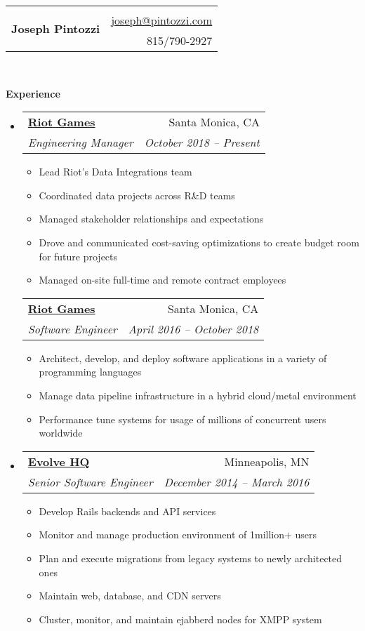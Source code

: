 \documentclass[letterpaper,12pt]{article}
\makeatletter
\newcommand{\resitem}[1]{\item #1 \vspace{-2pt}}
\newcommand{\resheading}[1]{{\large \colorbox{mygrey}{\begin{minipage}{\textwidth}{\textbf{#1 \vphantom{p\^{E}}}}\end{minipage}}}}
\newcommand{\ressubheading}[4]{
      \begin{tabular*}{6.5in}{l@{\extracolsep{\fill}}r}
        \textbf{#1} & #2 \\
        \textit{#3} & \textit{#4} \\
      \end{tabular*}\vspace{-6pt}}
\makeatother
\begin{document}
\newcommand{\mywebheader}{
  \begin{tabular*}{7in}{l@{\extracolsep{\fill}}r}
    \multirow{4}{*}{\huge \bf Joseph Pintozzi} \\
                            & \href{mailto:joseph@pintozzi.com}{joseph@pintozzi.com}\\
                            & {815/790-2927}
  \end{tabular*}
\\
\vspace{0.1in}
}

\mywebheader

\resheading{Experience}
\begin{itemize}
  \item
    \ressubheading{\href{http://riotgames.com}{Riot Games}}{Santa Monica, CA}{Engineering Manager}{October 2018 -- Present}
    { \footnotesize
    \begin{itemize}
        \resitem{Lead Riot's Data Integrations team}
        \resitem{Coordinated data projects across R\&D teams}
        \resitem{Managed stakeholder relationships and expectations}
        \resitem{Drove and communicated cost-saving optimizations to create budget room for future projects}
        \resitem{Managed on-site full-time and remote contract employees}
    \end{itemize}
    }
    \ressubheading{\href{http://riotgames.com}{Riot Games}}{Santa Monica, CA}{Software Engineer}{April 2016 -- October 2018}
    { \footnotesize
    \begin{itemize}
        \resitem{Architect, develop, and deploy software applications in a variety of programming languages}
        \resitem{Manage data pipeline infrastructure in a hybrid cloud/metal environment}
        \resitem{Performance tune systems for usage of millions of concurrent users worldwide}
    \end{itemize}
    }
  \item
    \ressubheading{\href{http://evolvehq.com/}{Evolve HQ}}{Minneapolis, MN}{Senior Software Engineer}{December 2014 -- March 2016}
    { \footnotesize
    \begin{itemize}
        \resitem{Develop Rails backends and API services}
        \resitem{Monitor and manage production environment of 1million+ users}
        \resitem{Plan and execute migrations from legacy systems to newly architected ones}
        \resitem{Maintain web, database, and CDN servers}
        \resitem{Cluster, monitor, and maintain ejabberd nodes for XMPP system}

\end{itemize}}
\end{itemize}
\end{document}
